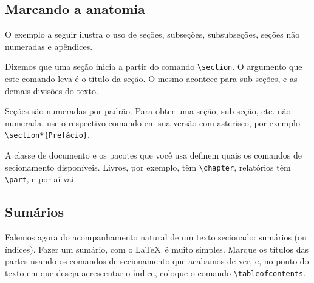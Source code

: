 \subsection{Marcando a anatomia}\label{sec:comandos-de-secionamento}

O exemplo a seguir ilustra o uso de seções, subseções, subsubseções, seções não numeradas e apêndices.


\medskip
{\footnotesize}

\medskip

Dizemos que uma seção inicia a partir do comando \verb'\section'. O
argumento que este comando leva é o título da seção. O mesmo acontece
para sub-seções, e as demais divisões do texto.

Seções são numeradas por padrão. Para obter uma seção, sub-seção, etc. não numerada,
use o respectivo comando em sua versão com asterisco, por
exemplo \verb'\section*{Prefácio}'.

A classe de documento e os pacotes que você usa definem quais os
comandos de secionamento disponíveis. Livros, por exemplo, têm
\verb'\chapter', relatórios têm \verb'\part', e por aí vai.

\subsection{Sumários}

Falemos agora do acompanhamento natural de um texto secionado:
sumários (ou índices). Fazer um sumário, com o
\LaTeX\ é muito simples. Marque os títulos das partes usando os comandos de
secionamento que acabamos de ver, e, no ponto do texto em que deseja
acrescentar o índice, coloque o comando \verb'\tableofcontents'.

